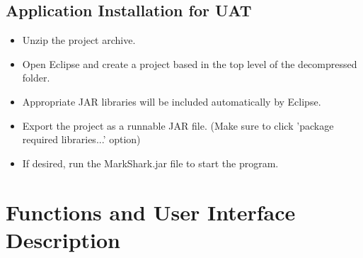 \documentclass{article}
\begin{document}
\subsection{Application Installation for UAT}
\begin{itemize}
\item Unzip the project archive.
\item Open Eclipse and create a project based in the top level of the decompressed folder.
\item Appropriate JAR libraries will be included automatically by Eclipse.
\item Export the project as a runnable JAR file. (Make sure to click 'package required libraries...' option)
\item If desired, run the MarkShark.jar file to start the program.

\end{itemize}

\clearpage
\section{Functions and User Interface Description}  %
\end{document}
